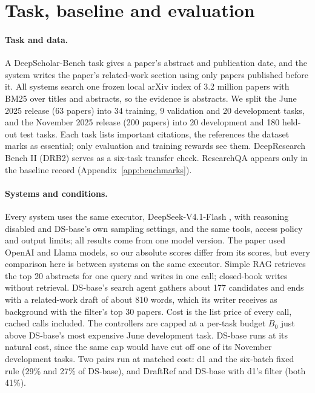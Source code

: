 \documentclass[11pt, letterpaper]{article}
\begin{document}
\section{Task, baseline and evaluation}
\label{sec:setup}

\paragraph{Task and data.} A DeepScholar-Bench task gives a paper's abstract and publication date,
and the system writes the paper's related-work section using only papers published before it. All
systems search one frozen local arXiv index of 3.2 million papers with BM25 \cite{robertson2009bm25}
over titles and abstracts, so the evidence is abstracts. We split the June 2025 release (63 papers)
into 34 training, 9 validation and 20 development tasks, and the November 2025 release (200 papers)
into 20 development and 180 held-out test tasks. Each task lists important citations, the references
the dataset marks as essential; only evaluation and training rewards see them. DeepResearch Bench II
(DRB2) \cite{li2026drb2} serves as a six-task transfer check. ResearchQA \cite{li2025researchqa}
appears only in the baseline record (Appendix~\ref{app:benchmarks}).

\paragraph{Systems and conditions.} Every system uses the same executor, DeepSeek-V4.1-Flash
\cite{deepseek2026v41flash}, with reasoning disabled and DS-base's own sampling settings, and the
same tools, access policy and output limits; all results come from one model version. The paper used
OpenAI and Llama models, so our absolute scores differ from its scores, but every comparison here is
between systems on the same executor. Simple RAG retrieves the top 20 abstracts for one query and
writes in one call; closed-book writes without retrieval. DS-base's search agent gathers about 177
candidates and ends with a related-work draft of about 810 words, which its writer receives as
background with the filter's top 30 papers. Cost is the
list price of every call, cached calls included. The controllers are capped at a per-task budget
$B_0$ just above DS-base's most expensive June development task. DS-base runs at its natural cost,
since the same cap would have cut off one of its November development tasks. Two pairs run at matched
cost: d1 and the six-batch fixed rule (29\% and 27\% of DS-base), and DraftRef and DS-base with d1's
filter (both 41\%).
\end{document}
